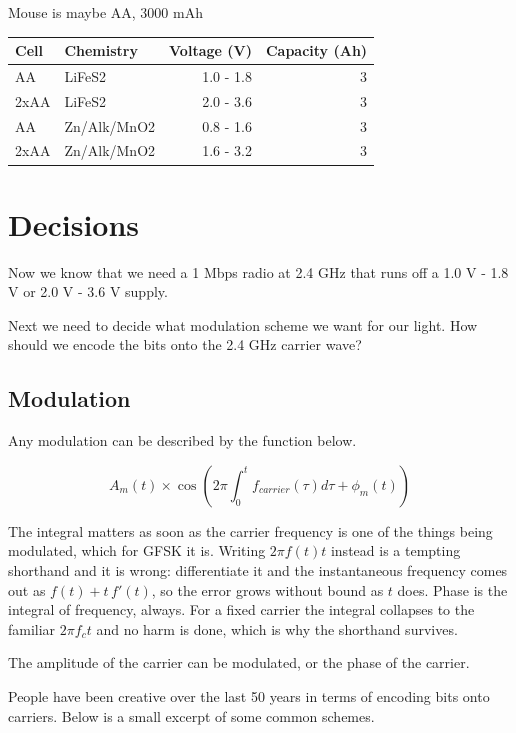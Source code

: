 Mouse is maybe AA, 3000 mAh

\begin{longtable}[]{@{}llrr@{}}
\toprule\noalign{}
Cell & Chemistry & Voltage (V) & Capacity (Ah) \\
\midrule\noalign{}
\endhead
\bottomrule\noalign{}
\endlastfoot
AA & LiFeS2 & 1.0 - 1.8 & 3 \\
2xAA & LiFeS2 & 2.0 - 3.6 & 3 \\
AA & Zn/Alk/MnO2 & 0.8 - 1.6 & 3 \\
2xAA & Zn/Alk/MnO2 & 1.6 - 3.2 & 3 \\
\end{longtable}

\section{Decisions}\label{decisions}

Now we know that we need a 1 Mbps radio at 2.4 GHz that runs off a 1.0 V
- 1.8 V or 2.0 V - 3.6 V supply.

Next we need to decide what modulation scheme we want for our light. How
should we encode the bits onto the 2.4 GHz carrier wave?

\subsection{Modulation}\label{modulation}

Any modulation can be described by the function below.

\[ A_m(t) \times \cos\left( 2 \pi \int_0^t f_{carrier}(\tau)d\tau + \phi_{m}(t)\right)\]

The integral matters as soon as the carrier frequency is one of the
things being modulated, which for GFSK it is. Writing \(2\pi f(t)t\)
instead is a tempting shorthand and it is wrong: differentiate it and
the instantaneous frequency comes out as \(f(t) + t\,f'(t)\), so the
error grows without bound as \(t\) does. Phase is the integral of
frequency, always. For a fixed carrier the integral collapses to the
familiar \(2\pi f_c t\) and no harm is done, which is why the shorthand
survives.

The amplitude of the carrier can be modulated, or the phase of the
carrier.

People have been creative over the last 50 years in terms of encoding
bits onto carriers. Below is a small excerpt of some common schemes.

